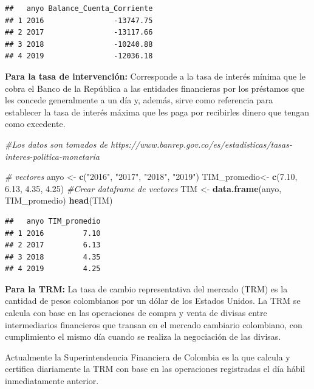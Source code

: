 \documentclass[
  11pt,
]{article}
\newenvironment{Shaded}{\begin{snugshade}}{\end{snugshade}}
\newcommand{\CommentTok}[1]{\textcolor[rgb]{0.56,0.35,0.01}{\textit{#1}}}
\newcommand{\FloatTok}[1]{\textcolor[rgb]{0.00,0.00,0.81}{#1}}
\newcommand{\KeywordTok}[1]{\textcolor[rgb]{0.13,0.29,0.53}{\textbf{#1}}}
\newcommand{\NormalTok}[1]{#1}
\newcommand{\StringTok}[1]{\textcolor[rgb]{0.31,0.60,0.02}{#1}}
\begin{document}
\begin{verbatim}
##   anyo Balance_Cuenta_Corriente
## 1 2016                -13747.75
## 2 2017                -13117.66
## 3 2018                -10240.88
## 4 2019                -12036.18
\end{verbatim}

\textbf{Para la tasa de intervención:} Corresponde a la tasa de interés
mínima que le cobra el Banco de la República a las entidades financieras
por los préstamos que les concede generalmente a un día y, además, sirve
como referencia para establecer la tasa de interés máxima que les paga
por recibirles dinero que tengan como excedente.

\begin{Shaded}
\begin{Highlighting}[]
\CommentTok{#Los datos son tomados de https://www.banrep.gov.co/es/estadisticas/tasas-interes-politica-monetaria}

\CommentTok{# vectores }
\NormalTok{anyo <-}\StringTok{ }\KeywordTok{c}\NormalTok{(}\StringTok{"2016"}\NormalTok{, }\StringTok{"2017"}\NormalTok{, }\StringTok{"2018"}\NormalTok{, }\StringTok{"2019"}\NormalTok{)}
\NormalTok{TIM_promedio<-}\StringTok{ }\KeywordTok{c}\NormalTok{(}\FloatTok{7.10}\NormalTok{, }\FloatTok{6.13}\NormalTok{, }\FloatTok{4.35}\NormalTok{, }\FloatTok{4.25}\NormalTok{)}
\CommentTok{#Crear dataframe de vectores}
\NormalTok{TIM <-}\StringTok{ }\KeywordTok{data.frame}\NormalTok{(anyo, TIM_promedio)}
\KeywordTok{head}\NormalTok{(TIM)}
\end{Highlighting}
\end{Shaded}

\begin{verbatim}
##   anyo TIM_promedio
## 1 2016         7.10
## 2 2017         6.13
## 3 2018         4.35
## 4 2019         4.25
\end{verbatim}

\textbf{Para la TRM:} La tasa de cambio representativa del mercado (TRM)
es la cantidad de pesos colombianos por un dólar de los Estados Unidos.
La TRM se calcula con base en las operaciones de compra y venta de
divisas entre intermediarios financieros que transan en el mercado
cambiario colombiano, con cumplimiento el mismo día cuando se realiza la
negociación de las divisas.

Actualmente la Superintendencia Financiera de Colombia es la que calcula
y certifica diariamente la TRM con base en las operaciones registradas
el día hábil inmediatamente anterior.
\end{document}
